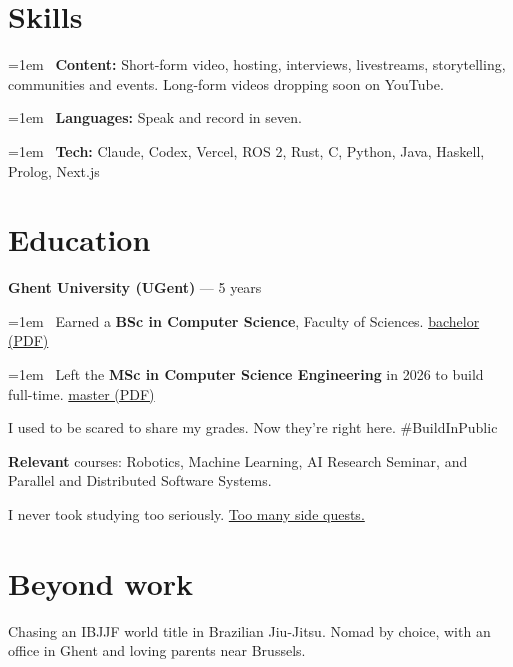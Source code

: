 \documentclass[letterpaper,11pt]{article}
\begin{document}
\section{Skills}
\hangindent=1em \textbullet\ \textbf{Content:} Short-form video, hosting, interviews, livestreams, storytelling, communities and events. Long-form videos dropping soon on YouTube.\par
\hangindent=1em \textbullet\ \textbf{Languages:} Speak and record in seven.\par
\hangindent=1em \textbullet\ \textbf{Tech:} Claude, Codex, Vercel, ROS 2, Rust, C, Python, Java, Haskell, Prolog, Next.js\par
\section{Education}
\textbf{Ghent University (UGent)} — 5 years\par
\hangindent=1em \textbullet\ Earned a \textbf{BSc in Computer Science}, Faculty of Sciences. \href{https://corvus.gent/cv/transcripts/bachelor.pdf}{bachelor (PDF)}\par
\hangindent=1em \textbullet\ Left the \textbf{MSc in Computer Science Engineering} in 2026 to build full-time. \href{https://corvus.gent/cv/transcripts/master.pdf}{master (PDF)}\par
I used to be scared to share my grades. Now they're right here. \#BuildInPublic\par
\textbf{Relevant} courses: Robotics, Machine Learning, AI Research Seminar, and Parallel and Distributed Software Systems.\par
I never took studying too seriously. \href{https://corvus.gent/sidequests}{Too many side quests.}\par
\section{Beyond work}
Chasing an IBJJF world title in Brazilian Jiu-Jitsu. Nomad by choice, with an office in Ghent and loving parents near Brussels.\par
\end{document}
